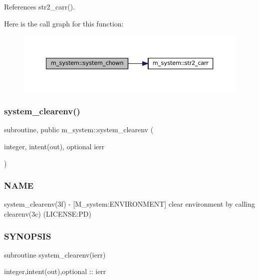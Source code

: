 References str2\+\_\+carr().

Here is the call graph for this function\+:\nopagebreak
\begin{figure}[H]
\begin{center}
\leavevmode
\includegraphics[width=350pt]{namespacem__system_ab89e4d2fb219225c374570d4f9d58e9b_cgraph}
\end{center}
\end{figure}
\mbox{\label{namespacem__system_a9c34787b170ab8d41000d7c3acb60736}} 
\subsubsection{\texorpdfstring{system\+\_\+clearenv()}{system\_clearenv()}}
{\footnotesize\ttfamily subroutine, public m\+\_\+system\+::system\+\_\+clearenv (\begin{DoxyParamCaption}\item[{integer, intent(out), optional}]{ierr }\end{DoxyParamCaption})}



\subsubsection*{N\+A\+ME}

system\+\_\+clearenv(3f) -\/ \mbox{[}M\+\_\+system\+:E\+N\+V\+I\+R\+O\+N\+M\+E\+NT\mbox{]} clear environment by calling clearenv(3c) (L\+I\+C\+E\+N\+SE\+:PD) 

\subsubsection*{S\+Y\+N\+O\+P\+S\+IS}

\begin{DoxyVerb}subroutine system_clearenv(ierr)

 integer,intent(out),optional :: ierr
\end{DoxyVerb}


